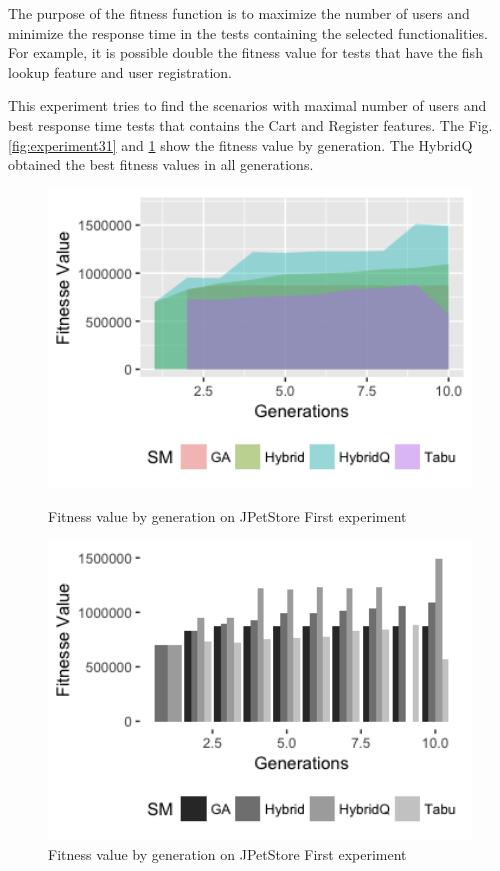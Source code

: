 The purpose of the fitness function is to maximize the number of users and minimize the response time in the tests containing the selected functionalities. For example, it is possible double the fitness value for tests that have the fish lookup feature and user registration.


This experiment tries to find the scenarios with maximal number of users and best response time tests that contains the Cart and Register features. The Fig. \ref{fig:experiment31} and \ref{fig:experiment32} show the fitness value by generation. The HybridQ obtained the best fitness values in all generations.

\begin{figure}[h]
\begin{minipage}{.5\textwidth}
\centering
\includegraphics[width=1\textwidth]{./images/experiment3-1.png}
\caption{Fitness value by generation on JPetStore First experiment}
\label{fig:experiment31}
\end{minipage}
\begin{minipage}{.5\textwidth}
\centering
\includegraphics[width=1\textwidth]{./images/experiment3-2.png}
\caption{Fitness value by generation on JPetStore First experiment}
\label{fig:experiment32}
\end{minipage}
\end{figure}

